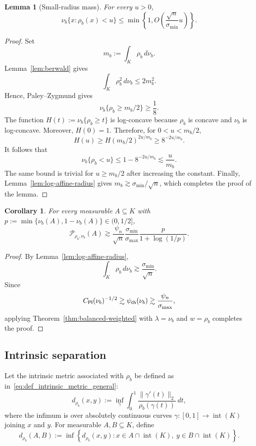 \documentclass[11pt]{article}
\newtheorem{lemma}[theorem]{Lemma}
\newtheorem{corollary}[theorem]{Corollary}
\theoremstyle{definition}
\theoremstyle{remark}
\newcommand{\cP}{\mathcal P}
\begin{document}
\begin{lemma}[Small-radius mass]
\label{lem:log-affine-small-radius}
For every $u>0$,
\begin{equation}\label{eq:log-affine-small-radius}
 \nu_b\{x:\rho_b(x)<u\}
 \le
 \min\left\{
  1,
  O\left(\frac{\sqrt n}{\sigma_{\min}}u\right)
 \right\}.
\end{equation}
\end{lemma}

\begin{proof}
Set
\[
 m_b:=\int_K\rho_b\,d\nu_b.
\]
Lemma~\ref{lem:berwald} gives
\[
 \int_K\rho_b^2\,d\nu_b\le2m_b^2.
\]
Hence, Paley--Zygmund gives
\[
 \nu_b\{\rho_b\ge m_b/2\}\ge\frac18.
\]
The function $H(t):=\nu_b\{\rho_b\ge t\}$ is log-concave because $\rho_b$ is concave and $\nu_b$ is log-concave.   Moreover, $H(0)=1$. Therefore, for
$0<u<m_b/2$,
\[
 H(u)
 \ge H(m_b/2)^{2u/m_b}
 \ge 8^{-2u/m_b}.
\]
It follows that
\[
 \nu_b\{\rho_b<u\}
 \le
 1-8^{-2u/m_b}
 \lesssim \frac{u}{m_b}.
\]
The same bound is trivial for $u\ge m_b/2$ after increasing the constant. Finally, Lemma~\ref{lem:log-affine-radius} gives $m_b\gtrsim \sigma_{\min}/\sqrt{n}$, which completes the proof of the lemma.
\end{proof}


\begin{corollary}
\label{cor:log-affine-radius-profile}
For every measurable $A\subseteq K$ with $p:=\min\{\nu_b(A),1-\nu_b(A)\}\in (0,1/2]$,
\begin{equation}\label{eq:log-affine-radius-profile-general}
 \cP_{\rho_b,\nu_b}(A)
 \gtrsim \frac{\psi_n}{\sqrt n}
  \frac{\sigma_{\min}}
       {\sigma_{\max}}
 \frac{p}{1+\log(1/p)}.
\end{equation}
\end{corollary}

\begin{proof}
By Lemma~\ref{lem:log-affine-radius},
\[
 \int_K\rho_b\,d\nu_b
 \gtrsim \frac{\sigma_{\min}}{\sqrt n}.
\]
Since
\[
 C_{\sf PI}(\nu_b)^{-1/2}
 \gtrsim
 \psi_{\sf ch}(\nu_b)
 \gtrsim
 \frac{\psi_n}
 {\sigma_{\max}},
\]
applying Theorem~\ref{thm:balanced-weighted} with
$\lambda=\nu_b$ and $w=\rho_b$ completes the proof.
\end{proof}

\subsection{Intrinsic separation}
Let the intrinsic metric associated with $\rho_b$ be defined as in~\eqref{eq:def_intrinsic_metric_general}:
\begin{equation}\label{eq:log-affine-intrinsic-metric}
 d_{\rho_b}(x,y)
 :=
 \inf_{\gamma}
 \int_0^1
 \frac{\|\gamma'(t)\|_2}{\rho_b(\gamma(t))}\,dt,
\end{equation}
where the infimum is over absolutely continuous curves
$\gamma:[0,1]\to\operatorname{int}(K)$ joining $x$ and $y$.
For measurable $A,B\subseteq K$, define
\[
 d_{\rho_b}(A,B)
 :=
 \inf\left\{
 d_{\rho_b}(x,y):
 x\in A\cap\operatorname{int}(K),\
 y\in B\cap\operatorname{int}(K)
 \right\}.
\]
\end{document}
